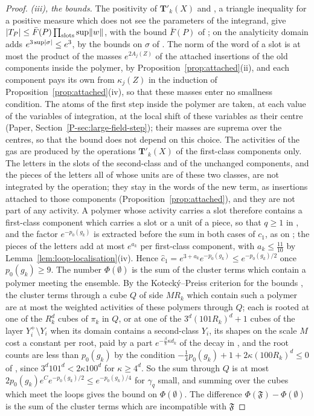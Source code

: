 \documentclass[11pt]{preprint}
\DeclarePairedDelimiter{\abs}{\lvert}{\rvert}
\DeclarePairedDelimiter{\norm}{\lVert}{\rVert}
\numberwithin{equation}{section}
\theoremstyle{definition}
\theoremstyle{remark}
\theoremstyle{plain}
\begin{document}
\begin{proof}
\emph{(iii), the bounds.} The positivity of $\mathbf T'_k(X)$ and \cite[(1.73), p.~380]{BalabanLFR2}, a triangle inequality for a positive measure which does not see the parameters of the integrand, give $\abs{T_P} \leq \bar F(P)\prod_{\text{slots}}\sup\norm{w}$, with the bound $\bar F(P)$ of \cite[(1.92)]{BalabanLFR2}; on the analyticity domain \cite[(1.75), p.~380]{BalabanLFR2} adds $e^{3\sup\abs\sigma} \leq e^3$, by the bounds on $\sigma$ of \cite[p.~379]{BalabanLFR2}. The norm of the word of a slot is at most the product of the masses $e^{2A_j(Z)}$ of the attached insertions of the old components inside the polymer, by Proposition~\ref{prop:attached}(ii), and each component pays its own from $\kappa_j(Z)$ in the induction of Proposition~\ref{prop:attached}(iv), so that these masses enter no smallness condition. The atoms of the first step inside the polymer are taken, at each value of the variables of integration, at the local shift of these variables as their centre (Paper, Section~\ref{P-sec:large-field-step}); their masses are suprema over the centres, so that the bound does not depend on this choice. The activities of the gas are produced by the operations $\mathbf T'_k(X)$ of the first-class components only. The letters in the slots of the second-class and of the unchanged components, and the pieces of the letters all of whose units are of these two classes, are not integrated by the operation; they stay in the words of the new term, as insertions attached to those components (Proposition~\ref{prop:attached}), and they are not part of any activity. A polymer whose activity carries a slot therefore contains a first-class component which carries a slot or a unit of a piece, so that $q \geq 1$ in \cite[(1.95), p.~389]{BalabanLFR2}, and the factor $e^{-p_0(g_k)}$ is extracted before the sum in both cases of $c_1$, as on \cite[p.~389]{BalabanLFR2}; the pieces of the letters add at most $e^{a_k}$ per first-class component, with $a_k \leq \frac{11}{10}$ by Lemma~\ref{lem:loop-localisation}(iv). Hence $\hat c_1 = e^{3+a_k}e^{-p_0(g_k)} \leq e^{-p_0(g_k)/2}$ once $p_0(g_k) \geq 9$. The number $\Phi(\emptyset)$ is the sum of the cluster terms which contain a polymer meeting the ensemble. By the Koteck\'y--Preiss criterion \cite{KoteckyPreiss} for the bounds \cite[(1.97)]{BalabanLFR2}, the cluster terms through a cube $Q$ of side $MR_k$ which contain such a polymer are at most the weighted activities of these polymers through $Q$; each is rooted at one of the $R_k^d$ cubes of $\pi_k$ in $Q$, or at one of the $3^d(101R_k)^d + 1$ cubes of the layer $Y_i^+ \setminus Y_i$ when its domain contains a second-class $Y_i$, its shapes on the scale $M$ cost a constant per root, paid by a part $e^{-\frac\beta8\kappa d_k}$ of the decay in \cite[(1.95)]{BalabanLFR2}, and the root counts are less than $p_0(g_k)$ by the condition $-\frac14p_0(g_k) + 1 + 2\kappa(100R_k)^d \leq 0$ of \cite[p.~389]{BalabanLFR2}, since $3^d101^d < 2\kappa100^d$ for $\kappa \geq 4^d$. So the sum through $Q$ is at most $2p_0(g_k)e^{C}e^{-p_0(g_k)/2} \leq e^{-p_0(g_k)/4}$ for $\gamma_q$ small, and summing over the cubes which meet the loops gives the bound on $\Phi(\emptyset)$. The difference $\Phi(\mathfrak F) - \Phi(\emptyset)$ is the sum of the cluster terms which are incompatible with $\mathfrak F$ 
\end{proof}
\end{document}
